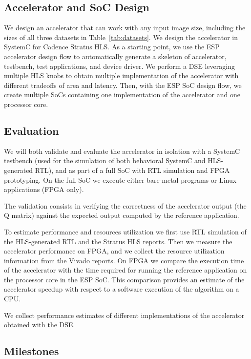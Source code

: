 \subsection{Accelerator and SoC Design}

We design an accelerator that can work with any input image size, including the
sizes of all three datasets in Table~\ref{tab:datasets}. We design the
accelerator in SystemC for Cadence Stratus HLS. As a starting point, we use the
ESP accelerator design flow to automatically generate a skeleton of accelerator,
testbench, test applications, and device driver.
%
We perform a DSE leveraging multiple HLS knobs to obtain
multiple implementation of the accelerator with different tradeoffs of area and
latency.
%
Then, with the ESP SoC design flow, we create multiple SoCs containing one
implementation of the accelerator and one processor core.

\subsection{Evaluation}

We will both validate and evaluate the accelerator in isolation with a SystemC
testbench (used for the simulation of both behavioral SystemC and HLS-generated
RTL), and as part of a full SoC with RTL simulation and FPGA prototyping. On the
full SoC we execute either bare-metal programs or Linux applications (FPGA
only).

The validation consists in verifying the correctness of the
accelerator output (the Q matrix) against the expected output computed by the
reference application.

To estimate performance and resources utilization we first use RTL simulation of
the HLS-generated RTL and the Stratus HLS reports. Then we measure the
accelerator performance on FPGA, and we collect the resource utilization
information from the Vivado reports. On FPGA we compare the execution time of
the accelerator with the time required for running the reference application on
the processor core in the ESP SoC. This comparison provides an estimate of the
accelerator speedup with respect to a software execution of the algorithm on a
CPU.

We collect performance estimates of different implementations of the
accelerator obtained with the DSE.

\subsection{Milestones}
\label{sec:milestones}

